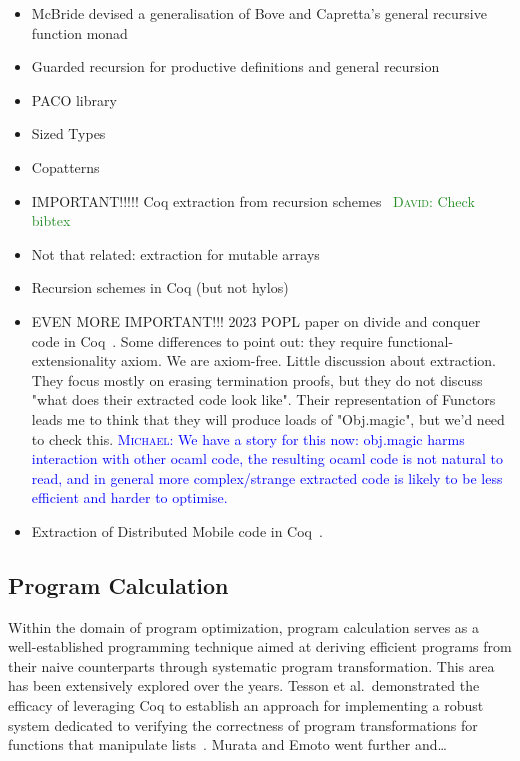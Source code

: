 \documentclass[anonymous, a4paper, UKenglish, cleveref, autoref, thm-restate]{lipics-v2021}
\newcommand{\dcas}[1]{\textcolor{ForestGreen}{\textsc{David}: #1}}
\newcommand{\mvol}[1]{\textcolor{blue}{\textsc{Michael}: #1}}
\begin{document}
\begin{itemize}
  \item McBride devised a generalisation of Bove and Capretta's general
recursive function monad~\cite{McBride15, BoveC01}
  \item Guarded recursion for productive definitions and general recursion
~\cite{AtkeyM13, PaviottiMB15}
  \item PACO library~\cite{HurNDV13}
  \item Sized Types \cite{HughesPS96, abs-1202-3496}
  \item Copatterns \cite{AbelPTS13, AbelP16}
  \item IMPORTANT!!!!! Coq extraction from recursion
    schemes~\cite{larchey2022braga} \dcas{Check bibtex}
  \item Not that related: extraction for mutable arrays~\cite{SAKAGUCHI2020102372}
  \item Recursion schemes in Coq (but not hylos)~\cite{MurataE19}
  \item EVEN MORE IMPORTANT!!! 2023 POPL paper on divide and conquer code in
    Coq~\cite{AbreuDHJMS23}.  Some differences to point out: they require
    functional-extensionality axiom. We are axiom-free. Little discussion about
    extraction. They focus mostly on erasing termination proofs, but they do
    not discuss "what does their extracted code look like". Their
    representation of Functors leads me to think that they will produce loads
        of "Obj.magic", but we'd need to check this. \mvol{We have a story for this now: obj.magic harms interaction with other ocaml code, the resulting ocaml code is not natural to read, and in general more complex/strange extracted code is likely to be less efficient and harder to optimise.}
        \item Extraction of Distributed Mobile code in Coq~\cite{MiculanP12}.
\end{itemize}

\subsection{Program Calculation}

Within the domain of program optimization, program calculation serves as a
well-established programming technique aimed at deriving efficient programs from
their naive counterparts through systematic program transformation. This area
has been extensively explored over the years. Tesson et al.\ demonstrated the
efficacy of leveraging Coq to establish an approach for implementing a robust
system dedicated to verifying the correctness of program transformations for
functions that manipulate lists~\cite{10.1007/978-3-642-17796-5_10}. Murata and
Emoto went further and\ldots~\cite{MurataE19}
\end{document}
